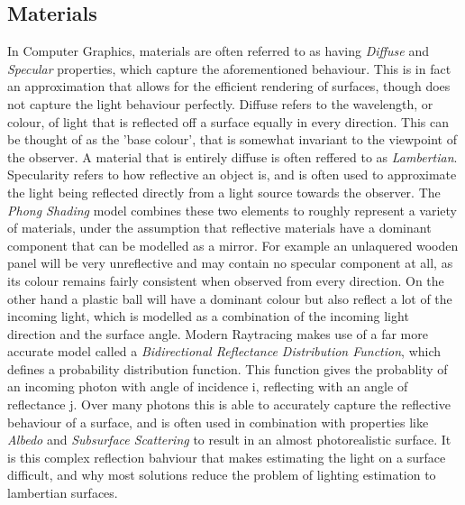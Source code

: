 \documentclass[ %
                    author={Gavin Parker},
                supervisor={Dr. Neill Campbell},
                    degree={MEng},
                     title={Deep Siamese Networks for Illumination Estimation from Stereo Images},
                  subtitle={},
                      type={research},
                      year={2018} ]{dissertation}
\begin{document}
\subsection{Materials}
In Computer Graphics, materials are often referred to as having \textit{Diffuse} and \textit{Specular} properties, which capture the aforementioned behaviour. This is in fact an approximation that allows for the efficient rendering of surfaces, though does not capture the light behaviour perfectly. Diffuse refers to the wavelength, or colour, of light that is reflected off a surface equally in every direction. This can be thought of as the 'base colour', that is somewhat invariant to the viewpoint of the observer. A material that is entirely diffuse is often reffered to as \textit{Lambertian}. Specularity refers to how reflective an object is, and is often used to approximate the light being reflected directly from a light source towards the observer. The \textit{Phong Shading} model combines these two elements to roughly represent a variety of materials, under the assumption that reflective materials have a dominant component that can be modelled as a mirror. For example an unlaquered wooden panel will be very unreflective and may contain no specular component at all, as its colour remains fairly consistent when observed from every direction. On the other hand a plastic ball will have a dominant colour but also reflect a lot of the incoming light, which is modelled as a combination of the incoming light direction and the surface angle. Modern Raytracing makes use of a far more accurate model called a \textit{Bidirectional Reflectance Distribution Function}, which defines a probability distribution function. This function gives the probablity of an incoming photon with angle of incidence i, reflecting with an angle of reflectance j. Over many photons this is able to accurately capture the reflective behaviour of a surface, and is often used in combination with properties like \textit{Albedo} and \textit{Subsurface Scattering} to result in an almost photorealistic surface. It is this complex reflection bahviour that makes estimating the light on a surface difficult, and why most solutions reduce the problem of lighting estimation to lambertian surfaces.
\end{document}
